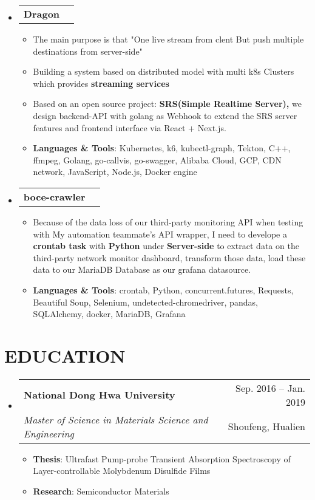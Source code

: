 \documentclass[letterpaper,11pt]{article}
\makeatletter
\newcommand{\resumeItem}[1]{
  \item\small{
    {#1 \vspace{-1pt}}
  }
}
\newcommand{\resumeSubheading}[4]{
  \vspace{-1pt}\item
    \begin{tabular*}{\textwidth}[t]{l@{\extracolsep{\fill}}r}
      \textbf{#1} & {\color{dark-grey}\small #2}\vspace{1pt}\\ %
      \textit{#3} & {\color{dark-grey} \small #4}\\ %
    \end{tabular*}\vspace{-4pt}
}
\newcommand{\resumeProjectHeading}[2]{
    \item
    \begin{tabular*}{\textwidth}{l@{\extracolsep{\fill}}r}
      #1 & {\color{dark-grey}} \\
    \end{tabular*}\vspace{-4pt}
}
\newcommand{\resumeSubHeadingListStart}{\begin{itemize}[leftmargin=0in, label={}]}
\newcommand{\resumeSubHeadingListEnd}{\end{itemize}}
\newcommand{\resumeItemListStart}{\begin{itemize}}
\newcommand{\resumeItemListEnd}{\end{itemize}\vspace{0pt}}
\makeatother
\begin{document}
    \resumeSubHeadingListStart
    \resumeProjectHeading
        {\textbf{Dragon}} {Dec. 2022 -- Apr. 2023}
        \resumeItemListStart
          \resumeItem{The main purpose is that "One live stream from clent But push multiple destinations from server-side"}
          \resumeItem{Building a system based on distributed model with multi k8s Clusters which provides \textbf{streaming services}}
          \resumeItem{Based on an open source project: \textbf{SRS(Simple Realtime Server),}}we design backend-API with golang as Webhook to extend the SRS server features and frontend interface via React + Next.js.
          \resumeItem{ \textbf{Languages \& Tools}: Kubernetes, k6, kubectl-graph, Tekton, C++, ffmpeg, Golang, go-callvis, go-swagger, Alibaba Cloud, GCP, CDN network, JavaScript, Node.js, Docker engine}
        \resumeItemListEnd          
    \resumeSubHeadingListEnd

    \resumeSubHeadingListStart
      \resumeProjectHeading
          {\textbf{boce-crawler}} {Apr. 2022 -- Jun. 2022}
          \resumeItemListStart            
            \resumeItem{Because of the data loss of our third-party monitoring API when testing with My automation teammate's API wrapper, I need to develope a \textbf{crontab task} with \textbf{Python} under \textbf{Server-side} to extract data on the third-party network monitor dashboard, transform those data, load these data to our MariaDB Database as our grafana datasource.}
            \resumeItem{ \textbf{Languages \& Tools}: crontab, Python, concurrent.futures, Requests, Beautiful Soup, Selenium, undetected-chromedriver, pandas, SQLAlchemy, docker, MariaDB, Grafana}
          \resumeItemListEnd          
    \resumeSubHeadingListEnd

\section {EDUCATION}
\resumeSubHeadingListStart
\resumeSubheading
  {National Dong Hwa University}{Sep. 2016 -- Jan. 2019}
  {Master of Science in Materials Science and Engineering}{Shoufeng, Hualien}
    \resumeItemListStart
  \resumeItem {\textbf{Thesis}: Ultrafast Pump-probe Transient Absorption Spectroscopy of Layer-controllable Molybdenum Disulfide Films}
    \resumeItem 
        {\textbf{Research}: Semiconductor Materials }
    \resumeItemListEnd
\resumeSubHeadingListEnd

%
\end{document}
